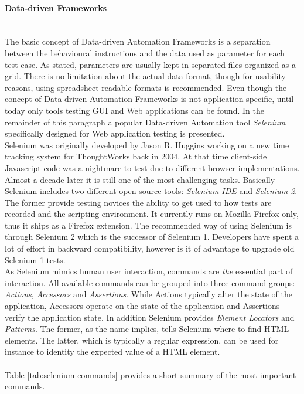 \documentclass[12pt, notitlepage]{article}
\begin{document}
\paragraph{Data-driven Frameworks} ~\\
The basic concept of Data-driven Automation Frameworks is a separation between the behavioural instructions and the data used as parameter for each test case. 
As \cite{record-playback} stated, parameters are usually kept in separated files organized as a grid. There is no limitation about the actual data format, though
for usability reasons, using spreadsheet readable formats is recommended. Even though the concept of Data-driven Automation Frameworks is not application specific, until today only tools testing GUI and Web applications can be found. In the remainder of this paragraph a popular Data-driven Automation
tool \textit{Selenium}\cite{selenium} specifically designed for Web application testing is presented.\\
Selenium was originally developed by Jason R. Huggins working on a new time tracking system for ThoughtWorks back in 2004\cite{shortcut-selenium}.
At that time client-side Javascript code was a nightmare to test due to different browser implementations. Almost a decade later it is still one of 
the most challenging tasks. Basically Selenium includes two different open source tools: \textit{Selenium IDE} and \textit{Selenium 2}. 
The former provide testing novices the ability to get used to how tests are recorded and the scripting environment. It currently runs on Mozilla Firefox only, thus it
ships as a Firefox extension. The recommended way of using Selenium is through Selenium 2 which is the successor of Selenium 1. Developers have spent a lot of effort in backward compatibility, however is it of advantage to upgrade old Selenium 1 tests. \\
As Selenium mimics human user interaction, commands are \textit{the} essential part of interaction. All available commands can be
grouped into three command-groups: \textit{Actions}, \textit{Accessors} and \textit{Assertions}. While Actions typically alter the state of the application, Accessors operate on the state of the application and Assertions verify the application state. 
In addition Selenium provides \textit{Element Locators} and \textit{Patterns}. The former, as the name implies, tells Selenium where
to find HTML elements. The latter, which is typically a regular expression, can be used for instance to identity the expected value 
of a HTML element.
\\\\ 
Table \ref{tab:selenium-commands} provides a short summary of the most important commands.\\ 
\end{document}
